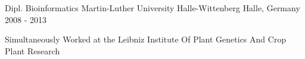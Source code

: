 


\begin{cventries}


\cventry
{Dipl. Bioinformatics} %
{Martin-Luther University Halle-Wittenberg} %
{Halle, Germany} %
{2008 - 2013} %
{ %
\begin{cvitems}
\item {Simultaneously Worked at the Leibniz Institute Of Plant Genetics And Crop Plant Research}
\end{cvitems}
}


\end{cventries}
